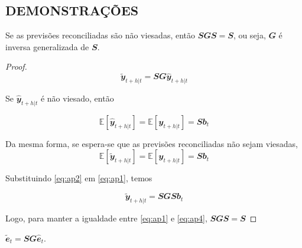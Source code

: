 \begin{apendicesenv}
\chapter{DEMONSTRAÇÕES} \label{apendice_demonstracoes}

\begin{proposition}
  \label{proposicao1}

  Se as previsões reconciliadas são não viesadas, então $\mathbfit{SGS=S}$, ou seja, $\mathbfit{G}$ é inversa generalizada de $\mathbfit{S}$.

\end{proposition}

\begin{proof}
  \begin{equation} \label{eq:ap1}
    \mathbfit{\tilde{y}}_{t+h|t} = \mathbfit{SG\hat{y}}_{t+h|t} 
  \end{equation}

  Se $\mathbfit{\hat{y}}_{t+h|t}$ é não viesado, então 

  \begin{equation} \label{eq:ap2}
      \mathbb{E}[\mathbfit{\hat{y}}_{t+h|t}] = \mathbb{E}[\mathbfit{y}_{t+h|t}] = \mathbfit{Sb}_t
  \end{equation}

  Da mesma forma, se espera-se que as previsões reconciliadas não sejam viesadas,
  \begin{equation} \label{eq:ap3}
      \mathbb{E}[\mathbfit{\tilde{y}}_{t+h|t}] = \mathbb{E}[\mathbfit{y}_{t+h|t}] = \mathbfit{Sb}_t
  \end{equation}

  Substituindo \eqref{eq:ap2} em \eqref{eq:ap1}, temos

  \begin{equation} \label{eq:ap4}
      \mathbfit{\tilde{y}}_{t+h|t} = \mathbfit{SGSb}_t 
  \end{equation}

  Logo, para manter a igualdade entre \eqref{eq:ap1} e \eqref{eq:ap4}, $\mathbfit{SGS=S}$

\end{proof}

\begin{proposition}
  \label{proposicao2}

  $\mathbfit{\tilde{e}}_t = \mathbfit{SG\hat{e}}_t$.

\end{proposition}


\end{apendicesenv}
